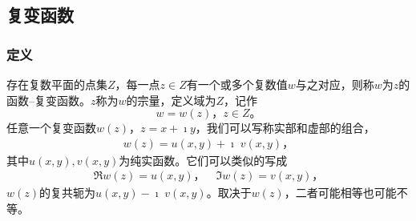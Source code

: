 
\subsection{复变函数}
\label{sub:complexfunctions}

\subsubsection{定义}
\label{subsub:cmplx_func_def}

存在复数平面的点集$Z$，每一点$z\in Z$有一个或多个复数值$w$与之对应，则称$w$为$z$的函数--复变函数。$z$称为$w$的宗量，定义域为$Z$，记作
\begin{equation}
    w = w(z)\textrm{，} z\in Z \textrm{。}
\end{equation}
任意一个复变函数$w(z)$，$z=x + \imath y$，我们可以写称实部和虚部的组合，
\begin{align}
    w(z) = u(x,y) +\imath \; v(x,y) \textrm{，}
\end{align}
其中$u(x,y), v(x,y)$为纯实函数。它们可以类似的写成
\begin{align}
    \Re w(z) = u(x,y)\textrm{，} \quad \Im w(z) = v(x,y) \textrm{，}
\end{align}
$w(z)$的复共轭为$u(x,y) - \imath \; v(x,y)$。取决于$w(z)$，二者可能相等也可能不等。

